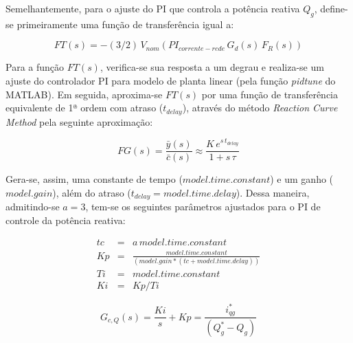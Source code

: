
Semelhantemente, para o ajuste do PI que controla a potência reativa $Q_g$, define-se primeiramente uma função de transferência igual a:

\begin{equation}
\label{eq:tf_cl_inner_Q}
  FT(s) = -(3/2)\,V_{nom}\left(PI_{corrente-rede}\,G_{d}(s)\,F_R(s)\right)
\end{equation}

Para a função $FT(s)$, verifica-se sua resposta a um degrau e realiza-se um ajuste do controlador PI para modelo de planta linear (pela função \textit{pidtune} do MATLAB). Em seguida, aproxima-se $FT(s)$ por uma função de transferência equivalente de 1ª ordem com atraso ($t_{delay}$), através do método \textit{Reaction Curve Method} pela seguinte aproximação:

\begin{equation}
\label{eq:react_curve_Q}
  FG(s) = \frac{\bar{y}(s)}{\bar{c}(s)} \approx \frac{K\,e^{s\,t_{delay}}}{1 + s\,\tau}
\end{equation}

Gera-se, assim, uma constante de tempo ($model.time.constant$) e um ganho ($model.gain$), além do atraso ($t_{delay} = model.time.delay$). Dessa maneira, admitindo-se $a = 3$, tem-se os seguintes parâmetros ajustados para o PI de controle da potência reativa:

\begin{eqnarray}
  tc &=& a\,model.time.constant
  \\
  Kp &=& \frac{model.time.constant}{(model.gain*(tc+model.time.delay))}
  \\
  Ti &=& model.time.constant
  \\
  Ki &=& Kp/Ti
\end{eqnarray}

\begin{equation}
\label{eq:PI_Q}
  G_{c,Q}(s) = \frac{Ki}{s} + Kp = \frac{i_{qg}^*}{(Q_{g}^*-Q_{g})}
\end{equation}








